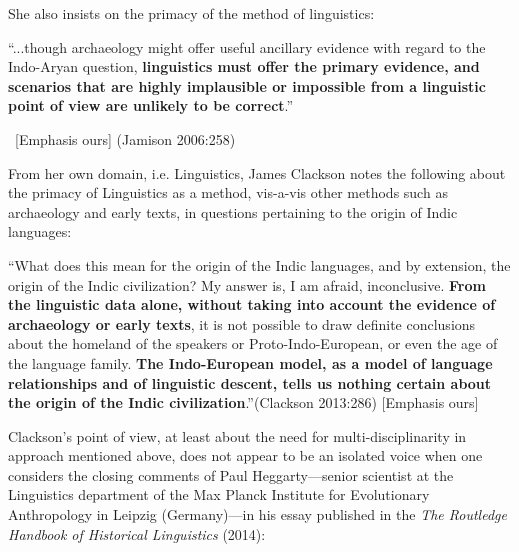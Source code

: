 She also insists on the primacy of the method of linguistics:

\begin{myquote}
“...though archaeology might offer useful ancillary evidence with regard to the Indo-Aryan question, \textbf{linguistics must offer the primary evidence, and scenarios that are highly implausible or impossible from a linguistic point of view are unlikely to be correct}.” 

~\hfill [Emphasis ours] (Jamison 2006:258)
\end{myquote}

From her own domain, i.e. Linguistics, James Clackson notes the following about the primacy of Linguistics as a method, vis-a-vis other methods such as archaeology and early texts, in questions pertaining to the origin of Indic languages:

\begin{myquote}
“What does this mean for the origin of the Indic languages, and by extension, the origin of the Indic civilization? My answer is, I am afraid, inconclusive. \textbf{From the linguistic data alone, without taking into account the evidence of archaeology or early texts}, it is not possible to draw definite conclusions about the homeland of the speakers or Proto-Indo-European, or even the age of the language family. \textbf{The Indo-European model, as a model of language relationships and of linguistic descent, tells us nothing certain about the origin of the Indic civilization}.”\hfill (Clackson 2013:286) [Emphasis ours]
\end{myquote}

Clackson’s point of view, at least about the need for multi-disciplinarity in approach mentioned above, does not appear to be an isolated voice when one considers the closing comments of Paul Heggarty—senior scientist at the Linguistics department of the Max Planck Institute for Evolutionary Anthropology in Leipzig (Germany)—in his essay published in the \textit{The Routledge Handbook of Historical Linguistics }(2014):

